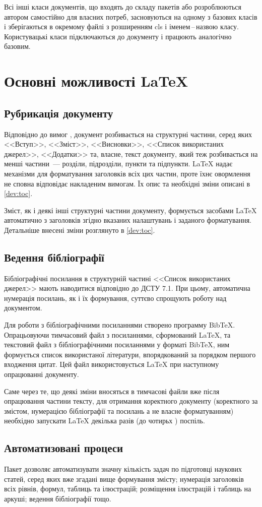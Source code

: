 Всі інші класи документів, що входять до складу пакетів або розроблюються автором самостійно для власних потреб, засновуються на одному з базових класів і зберігаються в окремому файлі з розширенням cls і іменем\,--\,назвою класу. Користувацькі класи підключаються до документу і працюють аналогічно базовим. 

\section{Основні можливості \LaTeX{}}

\subsection{Рубрикація документу}

Відповідно до вимог \cite{DSTU20153008}, документ розбивається на структурні частини, серед яких <<Вступ>>, <<Зміст>>, <<Висновки>>, <<Список використаних джерел>>, <<Додатки>> та, власне, текст документу, який теж розбивається на менші частини~--- розділи, підрозділи, пункти та підпункти. \LaTeX{} надає механізми для форматування заголовків всіх цих частин, проте їхнє овормлення не сповна відповідає накладеним вимогам. Їх опис та необхідні зміни описані в \ref{dev:toc}.

Зміст, як і деякі інші структурні частини документу, формується засобами \LaTeX{} автоматично з заголовків згідно вказаних налаштувань і заданого форматування. Детальніше внесені зміни розглянуто в \ref{dev:toc}.

\subsection{Ведення бібліографії}

Бібліографічні посилання в структурній частині <<Список використаних джерел>> мають наводитися відповідно до ДСТУ 7.1. При цьому, автоматична нумерація посилань, як і їх формування, суттєво спрощують роботу над документом. 

Для роботи з бібліографічними посиланнями створено программу BibTeX. Опрацьовуючи тимчасовий файл з посиланнями, сформований \LaTeX{}, та текстовий файл з бібліографічними посиланнями у форматі BibTeX, ним формується список використаної літератури, впорядкований за порядком першого входження цитат. Цей файл використовується \LaTeX{} при наступному опрацюванні документу.

Саме через те, що деякі зміни вносяться в тимчасові файли вже після опрацювання частини тексту, для отримання коректного документу (коректного за змістом, нумерацією бібліографії та посилань а не власне форматуванням) необхідно запускати \LaTeX{} декілька разів  (до чотирьх \cite{Stolyarov2010SverstaiDiplom}) поспіль.

\subsection{Автоматизовані процеси}

Пакет дозволяє автоматизувати значну кількість задач по підготовці наукових статей, серед яких вже згадані вище формування змісту; нумерація заголовків всіх рівнів, формул, таблиць та ілюстрацій; розміщення ілюстрацій і таблиць на аркуші; ведення бібліографії тощо.
